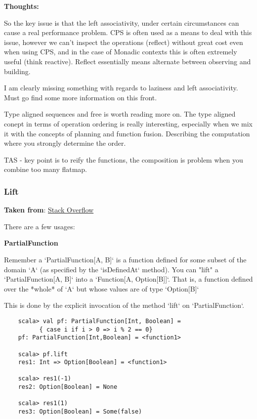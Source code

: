 \documentclass{article}
\begin{document}
\textbf{Thoughts:}

So the key issue is that the left associativity, under certain circumstances can cause a real performance problem. CPS is often used as a means to deal with this issue, however we can't inspect the operations (reflect) without great cost even when using CPS, and in the case of Monadic contexts this is often extremely useful (think reactive). Reflect essentially means alternate between observing and building.

I am clearly missing something with regards to laziness and left associativity. Must go find some more information on this front. 

Type aligned sequences and free is worth reading more on. The type aligned conept in terms of operation ordering is really interesting, especially when we mix it with the concepts of planning and function fusion. Describing the computation where you strongly determine the order.

TAS - key point is to reify the functions, the composition is problem when you combine too many flatmap.

\subsubsection{Lift}

\textbf{Taken from}: \href{http://stackoverflow.com/questions/17965059/what-is-lifting-in-scala}{Stack Overflow}

There are a few usages:

\textbf{PartialFunction}


Remember a `PartialFunction[A, B]` is a function defined for some subset of the domain `A` (as specified by the `isDefinedAt` method). You can "lift" a `PartialFunction[A, B]` into a `Function[A, Option[B]]`. That is, a function defined over the *whole* of `A` but whose values are of type `Option[B]`

This is done by the explicit invocation of the method `lift` on `PartialFunction`.

\begin{verbatim}
    scala> val pf: PartialFunction[Int, Boolean] = 
          { case i if i > 0 => i % 2 == 0}
    pf: PartialFunction[Int,Boolean] = <function1>

    scala> pf.lift
    res1: Int => Option[Boolean] = <function1>

    scala> res1(-1)
    res2: Option[Boolean] = None

    scala> res1(1)
    res3: Option[Boolean] = Some(false)
\end{verbatim}
\end{document}
